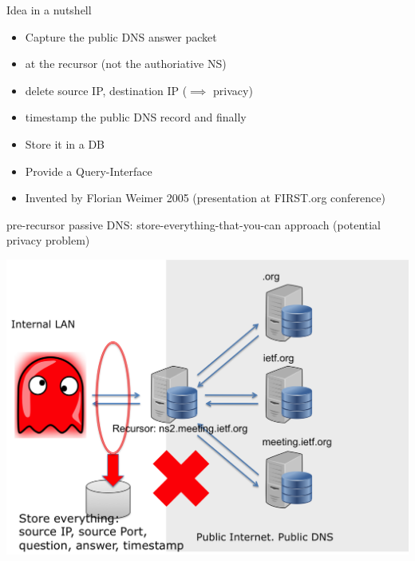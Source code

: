 
\begin{frame}[t,plain]
    \titlepage
\end{frame}

\begin{frame}[t]{Idea in a nutshell}
\begin{itemize}
\item Capture the public DNS answer packet 
\item at the recursor (not the authoriative NS)
\item delete source IP, destination IP ($\implies$ privacy)
\item timestamp the public DNS record and finally
\item Store it in a DB
\item Provide a Query-Interface
\item Invented by Florian Weimer 2005 (presentation at FIRST.org conference)
\end{itemize}
\end{frame}


\begin{frame}[t]{pre-recursor passive DNS: store-everything-that-you-can approach (potential privacy problem)}
\begin{centering}
  \vbox{}\vfill
  \includegraphics[scale=0.3]{pre-recursor.png}
  \vfill
\end{centering}
\end{frame}

